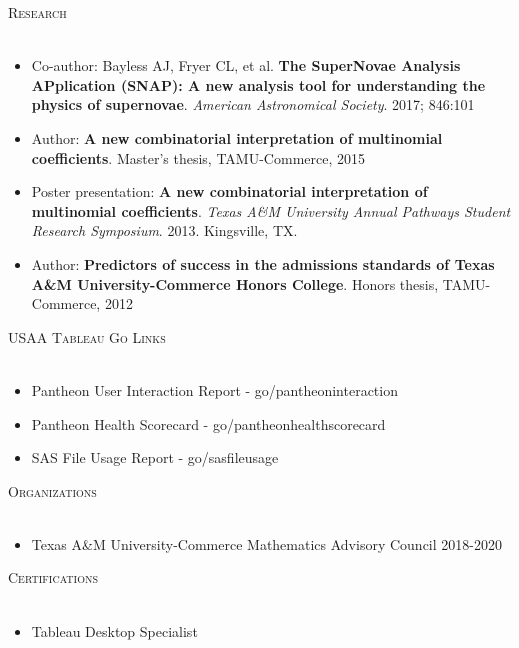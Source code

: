 \documentclass[a4paper]{article}
\newcommand{\lineunder} {
    \vspace*{-8pt} \\
    \hspace*{-18pt} \hrulefill \\
}
\newcommand{\header} [1] {
    {\hspace*{-18pt}\vspace*{6pt} \textsc{#1}}
    \vspace*{-6pt} \lineunder
}
\begin{document}
\header{Research}
\begin{itemize} \itemsep .5pt
	\item Co-author: Bayless AJ, Fryer CL, et al. \textbf{The SuperNovae Analysis APplication (SNAP): A new analysis tool for understanding the physics of supernovae}. \textit{American Astronomical Society}. 2017; 846:101
	\item Author: \textbf{A new combinatorial interpretation of multinomial coefficients}. Master's thesis, TAMU-Commerce, 2015
	\item Poster presentation: \textbf{A new combinatorial interpretation of multinomial coefficients}. \textit{Texas A\&M University Annual Pathways Student Research Symposium}. 2013. Kingsville, TX.
	\item Author: \textbf{Predictors of success in the admissions standards of Texas A\&M University-Commerce Honors College}. Honors thesis, TAMU-Commerce, 2012
\end{itemize}
\vspace{2mm}

\header{USAA Tableau Go Links}
\begin{itemize} \itemsep .5pt
	\item Pantheon User Interaction Report - go/pantheoninteraction
	\item Pantheon Health Scorecard - go/pantheonhealthscorecard
	\item SAS File Usage Report - go/sasfileusage
\end{itemize}
\vspace{2mm}

\header{Organizations}
\begin{itemize} \itemsep .5pt
	\item Texas A\&M University-Commerce Mathematics Advisory Council 2018-2020
\end{itemize}
\vspace{2mm}

\header{Certifications}
\begin{itemize} \itemsep .5pt
	\item Tableau Desktop Specialist
\end{itemize}
\vspace{2mm}
\ 
\end{document}
